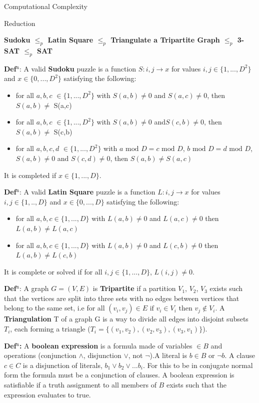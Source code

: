 \documentclass[final]{beamer}
\newlength{\colwidth}
\newcounter{row}
\newcounter{col}
\begin{document}
\begin{frame}[t]
\begin{columns}[t]
\begin{column}{\colwidth}
\begin{exampleblock}{Computational Complexity}
  \end{exampleblock}
  \begin{block}{Reduction}

   \textbf{Sudoku $\leq_p$ Latin Square $\leq_p$ Triangulate a Tripartite Graph $\leq_p$ 3-SAT $\leq_p$ SAT}

	\textbf{Def$^\text{n}$}: A valid \textbf{Sudoku} puzzle is a function $ S: i,j \rightarrow x$ for values $i,j \in \{1,...,D^2\}$ and $x \in \{0,...,D^2\}$ satisfying the following:
\begin{itemize}
	\item{for all $a,b,c$  $\in \{1,...,D^2\}$ with $S(a,b)\neq 0$ and $S(a,c)\neq 0$, then $ S(a,b)\neq$ S(a,c) }
	\item{for all $a,b,c$  $\in \{1,...,D^2\}$ with $S(a,b)\neq 0$ and$ S(c,b)\neq 0$, then $S(a,b)\neq$ S(c,b) }
	\item{for all $ a,b,c,d $ $\in \{1,...,D^2\}$ with $a\text{ mod }D = c\text{ mod }D$, $b\text{ mod }D  =  d\text{ mod }D$, $S(a,b)\neq 0$  and $S(c,d) \neq 0$, then $S(a,b)\neq S(a,c)$ }
\end{itemize}
It is completed if $x \in \{1,...,D\}$.


\textbf{Def$^\text{n}$}: A valid \textbf{Latin Square} puzzle is a function $L:i,j \rightarrow x$ for values $i,j \in \{1,..,D\} $ and $x \in \{0,...,D\}$ satisfying the following:
\begin{itemize}
\item{for all $a,b,c \in \{1,...,D\}$ with $L(a,b) \neq 0 $ and $L(a,c) \neq 0$ then $L(a,b) \neq L(a,c)$}
\item{for all $a,b,c \in \{1,...,D\}$ with $L(a,b) \neq 0 $ and $L(c,b) \neq 0$ then $L(a,b) \neq L(c,b)$}
\end{itemize}
It is complete or solved if for all $i,j \in \{1,...,D\}$, $L(i,j) \neq 0$.

\textbf{Def$^\text{n}$}: A graph $G=(V,E)$ is \textbf{Tripartite} if a partition $V_1$, $V_2$, $V_3$ exists such that the vertices are split into three sets with no edges between vertices that belong to the same set, i.e for all $(v_i,v_j) \in E\text{ if } v_i \in V_i\text{ then }v_j \not\in V_i $. A \textbf{Triangulation} T of a graph G is a way to divide all edges into disjoint subsets $T_i$, each forming a triangle ($T_i=\{(v_{1}, v_{2}),(v_{2}, v_{3}),(v_{3},v_{1})\}$).

\textbf{Def$^\text{n}$:} A \textbf{boolean expression} is a formula made of variables $\in B$ and operations (conjunction $\land$, disjunction $\lor$, not $\neg$).A literal is $b\in B$ or $\neg b$. A clause $c\in C$ is a disjunction of literals, $b_1 \lor b_2 \lor ... b_i$. For this to be in conjugate normal form the formula must be a conjunction of clauses. A boolean expression is satisfiable if a truth assignment to all members of $B$ exists such that the expression evaluates to true. 


\end{block}
\end{column}
\end{columns}
\end{frame}
\end{document}
